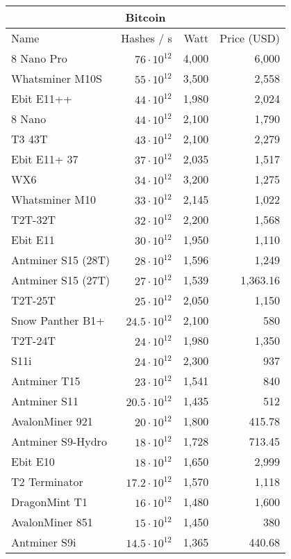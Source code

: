 \begin{longtable}{|p{}|r|r|r|}
  \hline
  \multicolumn{4}{|c|}{\textbf{Bitcoin}} \\
  \hline
  Name & Hashes / s & Watt & Price (USD) \\
  \hhline{|=|=|=|=|}
  8 Nano Pro & $76 \cdot 10^{12}$ & 4,000 & 6,000 \\
  Whatsminer M10S & $55 \cdot 10^{12}$ & 3,500 & 2,558 \\
  Ebit E11++ & $44 \cdot 10^{12}$ & 1,980 & 2,024 \\
  8 Nano & $44 \cdot 10^{12}$ & 2,100 & 1,790 \\
  T3 43T & $43 \cdot 10^{12}$ & 2,100 & 2,279 \\
  Ebit E11+ 37 & $37 \cdot 10^{12}$ & 2,035 & 1,517 \\
  WX6 & $34 \cdot 10^{12}$ & 3,200 & 1,275 \\
  Whatsminer M10 & $33 \cdot 10^{12}$ & 2,145 & 1,022 \\
  T2T-32T & $32 \cdot 10^{12}$ & 2,200 & 1,568 \\
  Ebit E11 & $30 \cdot 10^{12}$ & 1,950 & 1,110 \\
  Antminer S15 (28T) & $28 \cdot 10^{12}$ & 1,596 & 1,249 \\
  Antminer S15 (27T) & $27 \cdot 10^{12}$ & 1,539 & 1,363.16 \\
  T2T-25T & $25 \cdot 10^{12}$ & 2,050 & 1,150 \\
  Snow Panther B1+ & $24.5 \cdot 10^{12}$ & 2,100 & 580 \\
  T2T-24T & $24 \cdot 10^{12}$ & 1,980 & 1,350 \\
  S11i & $24 \cdot 10^{12}$ & 2,300 & 937 \\
  Antminer T15 & $23 \cdot 10^{12}$ & 1,541 & 840 \\
  Antminer S11 & $20.5 \cdot 10^{12}$ & 1,435 & 512 \\
  AvalonMiner 921 & $20 \cdot 10^{12}$ & 1,800 & 415.78 \\
  Antminer S9-Hydro & $18 \cdot 10^{12}$ & 1,728 & 713.45 \\
  Ebit E10 & $18 \cdot 10^{12}$ & 1,650 & 2,999 \\
  T2 Terminator & $17.2 \cdot 10^{12}$ & 1,570 & 1,118 \\
  DragonMint T1 & $16 \cdot 10^{12}$ & 1,480 & 1,600 \\
  AvalonMiner 851 & $15 \cdot 10^{12}$ & 1,450 & 380 \\
  Antminer S9i & $14.5 \cdot 10^{12}$ & 1,365 & 440.68 \\

\end{longtable}

